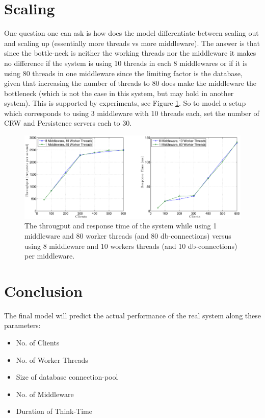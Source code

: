 \documentclass[a4paper, 11pt]{article}
\begin{document}
\section{Scaling}
	One question one can ask is how does the model differentiate between scaling out and scaling up (essentially more threads vs more middleware). The answer is that since the bottle-neck is neither the working threads nor the middleware it makes no difference if the system is using 10 threads in each 8 middlewares or if it is using 80 threads in one middleware since the limiting factor is the database, given that increasing the number of threads to 80 does make the middleware the bottleneck (which is not the case in this system, but may hold in another system). This is  supported by experiments, see Figure \ref{fig:1mw80th-vs-8mw10th}. So to model a setup which corresponds to using 3 middleware with 10 threads each, set the number of CRW and Persistence servers each to 30.

	\FloatBarrier
	\begin{figure}[cht!]
		\centering
			\includegraphics[width=1\linewidth,keepaspectratio]{1mw80th-vs-8mw10th}
		\caption{The througput and response time of the system while using 1 middleware and 80 worker threads (and 80 db-connections) versus using 8 middleware and 10 workers threads (and 10 db-connections) per middleware.}
		\label{fig:1mw80th-vs-8mw10th}
	\end{figure}
	\FloatBarrier


\section{Conclusion}
The final model will predict the actual performance of the real system along these parameters:
\begin{itemize}
	\item No. of Clients
	\item No. of Worker Threads
	\item Size of database connection-pool
	\item No. of Middleware
	\item Duration of Think-Time
\end{itemize}
\end{document}
